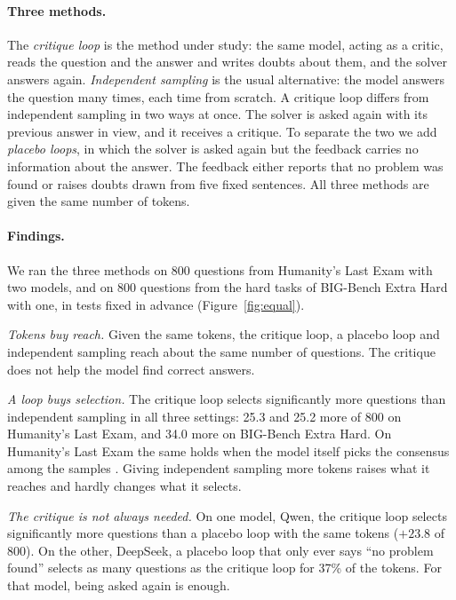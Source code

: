 \documentclass[11pt]{article}
\newcommand{\ds}{DeepSeek}
\newcommand{\qw}{Qwen}
\begin{document}
\paragraph{Three methods.}
The \emph{critique loop} is the method under study: the same model, acting as a critic, reads the question and the answer and writes doubts about them, and the solver answers again.
\emph{Independent sampling} is the usual alternative: the model answers the question many times, each time from scratch.
A critique loop differs from independent sampling in two ways at once.
The solver is asked again with its previous answer in view, and it receives a critique.
To separate the two we add \emph{placebo loops}, in which the solver is asked again but the feedback carries no information about the answer.
The feedback either reports that no problem was found or raises doubts drawn from five fixed sentences.
All three methods are given the same number of tokens.

\paragraph{Findings.}
We ran the three methods on 800 questions from Humanity's Last Exam \citep{phan2025hle} with two models, and on 800 questions from the hard tasks of BIG-Bench Extra Hard \citep{kazemi2025bbeh} with one, in tests fixed in advance (Figure~\ref{fig:equal}).

\emph{Tokens buy reach.}
Given the same tokens, the critique loop, a placebo loop and independent sampling reach about the same number of questions.
The critique does not help the model find correct answers.

\emph{A loop buys selection.}
The critique loop selects significantly more questions than independent sampling in all three settings: 25.3 and 25.2 more of 800 on Humanity's Last Exam, and 34.0 more on BIG-Bench Extra Hard.
On Humanity's Last Exam the same holds when the model itself picks the consensus among the samples \citep{chen2023usc}.
Giving independent sampling more tokens raises what it reaches and hardly changes what it selects.

\emph{The critique is not always needed.}
On one model, \qw, the critique loop selects significantly more questions than a placebo loop with the same tokens ($+23.8$ of 800).
On the other, \ds, a placebo loop that only ever says ``no problem found'' selects as many questions as the critique loop for 37\% of the tokens.
For that model, being asked again is enough.
\end{document}
